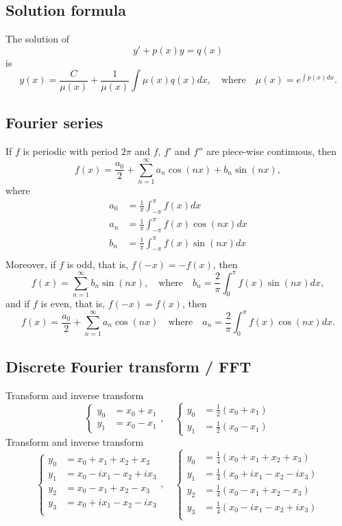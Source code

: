 \documentclass[12pt]{article}
\begin{document}
\newpage
\subsection*{Solution formula}

The solution of
$$
y'+p(x)y=q(x)
$$
is
$$
y(x)=\frac{C}{\mu(x)}+\frac{1}{\mu(x)}\int \mu(x)q(x)dx,\quad\textrm{where}\quad
\mu(x)=e^{\int p(x)dx}.
$$

\subsection*{Fourier series}

If $f$ is periodic with period $2\pi$ and $f$, $f'$ and $f''$ are piece-wise continuous, then
$$
f(x)
=\frac{a_0}{2}
+\sum_{n=1}^\infty a_n\cos(nx)+b_n\sin(nx),
$$
where
\begin{equation*}
\begin{split}
a_0&=\frac{1}{\pi}\int_{-\pi}^{\pi}
f(x)dx\\
a_n&=\frac{1}{\pi}\int_{-\pi}^{\pi}
f(x)\cos(nx)dx\\
b_n&=\frac{1}{\pi}\int_{-\pi}^{\pi}
f(x)\sin(nx)dx\\
\end{split}
\end{equation*}
Moreover, if $f$ is odd, that is, $f(-x)=-f(x)$,
then
$$
f(x)
=\sum_{n=1}^\infty b_n\sin(nx),
\quad\textrm{where}\quad
b_n=\frac{2}{\pi}\int_{0}^{\pi}
f(x)\sin(nx)dx,
$$
and if $f$ is even, that is, $f(-x)=f(x)$, then
$$
f(x)
=\frac{a_0}{2}
+\sum_{n=1}^\infty a_n\cos(nx)
\quad\textrm{where}\quad
a_n=\frac{2}{\pi}\int_{0}^{\pi}
f(x)\cos(nx)dx.
$$

\subsection*{Discrete Fourier transform / FFT}

Transform and inverse transform
$$
\begin{cases}
y_0&=x_0+x_1\\
y_1&=x_0-x_1
\end{cases},\quad
\begin{cases}
y_0&=\frac{1}{2}(x_0+x_1)\\
y_1&=\frac{1}{2}(x_0-x_1)
\end{cases}
$$
Transform and inverse transform
$$
\begin{cases}
y_0&=x_0+x_1+x_2+x_3\\
y_1&=x_0-ix_1-x_2+ix_3\\
y_2&=x_0-x_1+x_2-x_3\\
y_3&=x_0+ix_1-x_2-ix_3\\
\end{cases},\quad
\begin{cases}
y_0&=\frac{1}{4}(x_0+x_1+x_2+x_3)\\
y_1&=\frac{1}{4}(x_0+ix_1-x_2-ix_3)\\
y_2&=\frac{1}{4}(x_0-x_1+x_2-x_3)\\
y_3&=\frac{1}{4}(x_0-ix_1-x_2+ix_3)\\
\end{cases}
$$

\newpage
\end{document}
